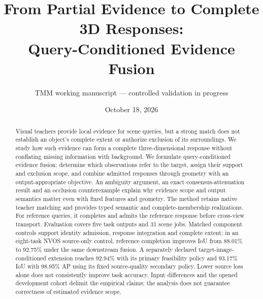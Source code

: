 \documentclass[10pt]{article}
\title{From Partial Evidence to Complete 3D Responses:\\Query-Conditioned Evidence Fusion}
\author{TMM working manuscript --- controlled validation in progress}
\date{October 18, 2026}
\begin{document}
\maketitle
\begin{abstract}
Visual teachers provide local evidence for scene queries, but a strong match
does not establish an object's complete extent or authorize exclusion of its
surroundings. We study how such evidence can form a complete three-dimensional
response without conflating missing information with background. We formulate
query-conditioned evidence fusion: determine which observations refer to the
target, assign their support and exclusion scope, and combine admitted responses
through geometry with an output-appropriate objective. An ambiguity argument,
an exact consensus-attenuation result and an occlusion counterexample explain
why evidence scope and output semantics matter even with fixed features and
geometry. The method retains native teacher matching and provides typed
semantic and complete-membership realizations. For reference queries, it
completes and admits the reference response before cross-view transport.
Evaluation covers five task outputs and 31 scene jobs. Matched component
controls support identity admission, response integration and complete extent;
in an eight-task NVOS source-only control, reference completion improves IoU
from 88.01\% to 92.75\% under the same downstream fusion. A separately declared
target-image-conditioned extension reaches 92.94\% with its primary feasibility
policy and 93.17\% IoU with 98.95\% AP using its fixed source-quality secondary
policy. Lower source loss alone does not consistently improve task accuracy.
Input differences and the opened development cohort delimit the empirical
claims; the analysis does not guarantee correctness of estimated evidence scope.
\end{abstract}







\end{document}
